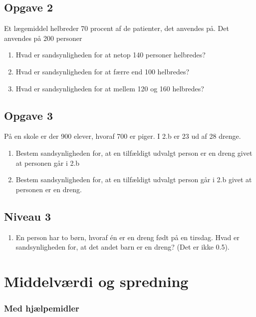 \documentclass[12pt]{article}
\begin{document}
\subsection*{Opgave 2}

Et lægemiddel helbreder 70 procent af de patienter, det anvendes på. Det anvendes på 200 personer
\begin{enumerate}[label=\roman*)]
	\item Hvad er sandsynligheden for at netop 140 personer helbredes?
	\item Hvad er sandsynligheden for at færre end 100 helbredes?
	\item Hvad er sandsynligheden for at mellem 120 og 160 helbredes?
\end{enumerate}

\subsection*{Opgave 3}
På en skole er der 900 elever, hvoraf 700 er piger. I 2.b er 23 ud af 28 drenge.
\begin{enumerate}[label=\roman*)]
	\item Bestem sandsynligheden for, at en tilfældigt udvalgt person er en dreng givet at personen går i 2.b
	\item Bestem sandsynligheden for, at en tilfældigt udvalgt person går i 2.b givet at personen er en dreng. 
\end{enumerate}

\subsection*{Niveau 3}

\begin{enumerate}[label=\roman*)]
	\item En person har to børn, hvoraf én er en dreng født på en tirsdag. Hvad er sandsynligheden for, at det andet barn er en dreng? (Det er ikke 0.5).
\end{enumerate}


\newpage

\section*{Middelværdi og spredning}

\subsubsection*{Med hjælpemidler}
\end{document}
